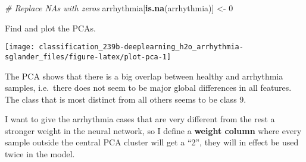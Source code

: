 \documentclass[]{book}
\newenvironment{Shaded}{\begin{snugshade}}{\end{snugshade}}
\newcommand{\CommentTok}[1]{\textcolor[rgb]{0.56,0.35,0.01}{\textit{#1}}}
\newcommand{\DataTypeTok}[1]{\textcolor[rgb]{0.13,0.29,0.53}{#1}}
\newcommand{\DecValTok}[1]{\textcolor[rgb]{0.00,0.00,0.81}{#1}}
\newcommand{\KeywordTok}[1]{\textcolor[rgb]{0.13,0.29,0.53}{\textbf{#1}}}
\newcommand{\NormalTok}[1]{#1}
\newcommand{\OperatorTok}[1]{\textcolor[rgb]{0.81,0.36,0.00}{\textbf{#1}}}
\newcommand{\OtherTok}[1]{\textcolor[rgb]{0.56,0.35,0.01}{#1}}
\newcommand{\StringTok}[1]{\textcolor[rgb]{0.31,0.60,0.02}{#1}}
\begin{document}
\begin{Shaded}
\begin{Highlighting}[]
\CommentTok{# Replace NAs with zeros}
\NormalTok{arrhythmia[}\KeywordTok{is.na}\NormalTok{(arrhythmia)] <-}\StringTok{ }\DecValTok{0}
\end{Highlighting}
\end{Shaded}

Find and plot the PCAs.

\begin{Shaded}
\end{Shaded}

\begin{center}\texttt{[image: classification\_239b-deeplearning\_h2o\_arrhythmia-sglander\_files/figure-latex/plot-pca-1]} \end{center}

The PCA shows that there is a big overlap between healthy and arrhythmia samples, i.e.~there does not seem to be major global differences in all features. The class that is most distinct from all others seems to be class 9.

I want to give the arrhythmia cases that are very different from the rest a stronger weight in the neural network, so I define a \textbf{weight column} where every sample outside the central PCA cluster will get a ``2'', they will in effect be used twice in the model.
\end{document}

